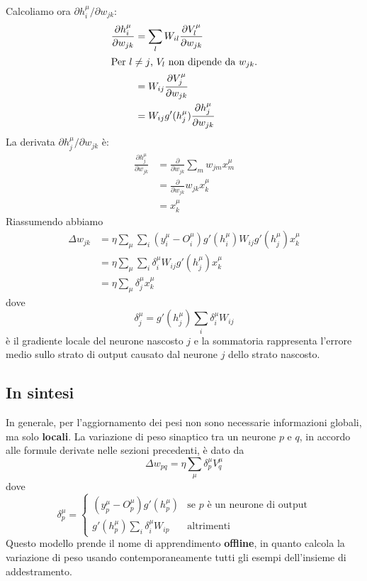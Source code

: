 Calcoliamo ora $\partial h^\mu_i / \partial w_{jk}$:
\begin{align*}
	\frac{\partial h^\mu_i}{\partial w_{jk}} &= \sum_l W_{il} \frac{\partial V_l^\mu}{\partial w_{jk}} \\
	\intertext{Per $l\neq j$, $V_l$ non dipende da $w_{jk}$.}
	&= W_{ij} \frac{\partial V_j^\mu}{\partial w_{jk}} \\
	&= W_{ij} g'(h^\mu_j) \frac{\partial h^\mu_j}{\partial w_{jk}}
\end{align*}
La derivata $\partial h^\mu_j / \partial w_{jk}$ è:
\begin{align*}
	\frac{\partial h^\mu_j}{\partial w_{jk}} 
	&= \frac{\partial}{\partial w_{jk}} \sum_m w_{jm} x^\mu_m \\
	&= \frac{\partial}{\partial w_{jk}} w_{jk} x^\mu_k\\
	&= x^\mu_k
\end{align*}
Riassumendo abbiamo
\begin{align*}
	\Delta w_{jk} &= \eta \sum_\mu \sum_i (y_i^\mu - O^\mu_i) g'(h^\mu_i) W_{ij} g'(h_j^\mu) x^\mu_k\\
	&= \eta \sum_\mu \sum_i \delta_i^\mu W_{ij} g'(h_j^\mu) x^\mu_k \\
	&= \eta \sum_\mu \delta_j^\mu x^\mu_k
\end{align*}
dove
\begin{displaymath}
	\delta_j^\mu = g'(h_j^\mu) \sum_i \delta^\mu_i W_{ij}
\end{displaymath}
è il gradiente locale del neurone nascosto $j$ e la sommatoria rappresenta l'errore medio sullo strato di output causato dal neurone $j$ dello strato nascosto.

\subsection{In sintesi}
\label{ssub:in_generale}

In generale, per l'aggiornamento dei pesi non sono necessarie informazioni globali, ma solo \textbf{locali}. La variazione di peso sinaptico tra un neurone $p$ e $q$, in accordo alle formule derivate nelle sezioni precedenti, è dato da
\begin{displaymath}
	\Delta w_{pq} = \eta \sum_\mu \delta^\mu_p V^\mu_q
\end{displaymath}
dove
\begin{displaymath}
	\delta_p^\mu = \begin{cases}
		(y^\mu_p - O^\mu_p) g'(h^\mu_p) & \text{se $p$ è un neurone di output} \\
		\displaystyle g'(h_p^\mu) \sum_i \delta^\mu_i W_{ip} &\text{altrimenti}
	\end{cases}
\end{displaymath}
Questo modello prende il nome di apprendimento \textbf{offline}, in quanto calcola la variazione di peso usando contemporaneamente tutti gli esempi dell'insieme di addestramento.

